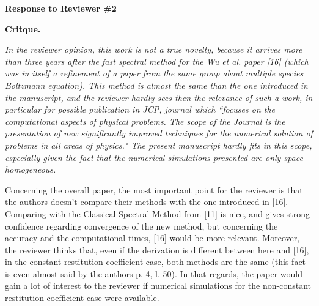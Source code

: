 \documentclass[11pt]{article}
\begin{document}
\vspace{0.3in}
\centerline{{\large \bf{Response to Reviewer \#2}}}
\bigskip

{\bf Critque.} {\it In the reviewer opinion, this work is not a true novelty, because it arrives more than three years after the fast spectral method for the Wu et al. paper [16] (which was in itself a refinement of a paper from the same group about multiple species Boltzmann equation). This method is almost the same than the one introduced in the manuscript, and the reviewer hardly sees then the relevance of such a work, in particular for possible publication in JCP, journal which ``focuses on the computational aspects of physical problems. The scope of the Journal is the presentation of new significantly improved techniques for the numerical solution of problems in all areas of physics." The present manuscript hardly fits in this scope, especially given the fact that the numerical simulations presented are only space homogeneous.

Concerning the overall paper, the most important point for the reviewer is that the authors doesn't compare their methods with the one introduced in [16]. Comparing with the Classical Spectral Method from [11] is nice, and gives strong confidence regarding convergence of the new method, but concerning the accuracy and the computational times, [16] would be more relevant. Moreover, the reviewer thinks that, even if the derivation is different between here and [16], in the constant restitution coefficient case, both methods are the same (this fact is even almost said by the authors p. 4, l. 50). In that regards, the paper would gain a lot of interest to the reviewer if numerical simulations for the non-constant restitution coefficient-case were available.
}
\end{document}
